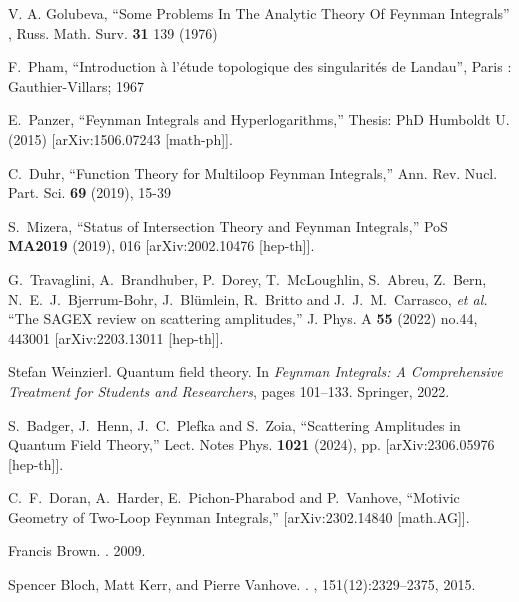 \documentclass[a4paper,12pt]{article}
\numberwithin{equation}{section}
\numberwithin{figure}{section}
\begin{document}
\begin{thebibliography}{99}

  

 V. A. Golubeva, ``Some Problems In The Analytic
  Theory Of Feynman Integrals'' , Russ. Math. Surv. {\bf 31} 139 (1976)

 F.~Pham, ``Introduction \`a l'\'etude topologique des
  singularit\'es de Landau'', Paris : Gauthier-Villars; 1967

E.~Panzer,
``Feynman Integrals and Hyperlogarithms,''
Thesis: PhD Humboldt U. (2015)
[arXiv:1506.07243 [math-ph]].

C.~Duhr,
``Function Theory for Multiloop Feynman Integrals,''
Ann. Rev. Nucl. Part. Sci. \textbf{69} (2019), 15-39

S.~Mizera,
``Status of Intersection Theory and Feynman Integrals,''
PoS \textbf{MA2019} (2019), 016
[arXiv:2002.10476 [hep-th]].

G.~Travaglini, A.~Brandhuber, P.~Dorey, T.~McLoughlin, S.~Abreu, Z.~Bern, N.~E.~J.~Bjerrum-Bohr, J.~Bl\"umlein, R.~Britto and J.~J.~M.~Carrasco, \textit{et al.}
``The SAGEX review on scattering amplitudes,''
J. Phys. A \textbf{55} (2022) no.44, 443001
[arXiv:2203.13011 [hep-th]].

Stefan Weinzierl.
\newblock Quantum field theory.
\newblock In {\em Feynman Integrals: A Comprehensive Treatment for Students and
  Researchers}, pages 101--133. Springer, 2022.
\newblock [arXiv:2201.03593] 


S.~Badger, J.~Henn, J.~C.~Plefka and S.~Zoia,
``Scattering Amplitudes in Quantum Field Theory,''
Lect. Notes Phys. \textbf{1021} (2024), pp.
[arXiv:2306.05976 [hep-th]].


C.~F.~Doran, A.~Harder, E.~Pichon-Pharabod and P.~Vanhove,
``Motivic Geometry of Two-Loop Feynman Integrals,''
[arXiv:2302.14840 [math.AG]].


Francis Brown.
.
 2009.
\newblock [arXiv:0910.0114]  

Spencer Bloch, Matt Kerr, and Pierre Vanhove.
.
, 151(12):2329--2375, 2015.
\newblock [arXiv:1406.2664] 


\end{thebibliography}
\end{document}
